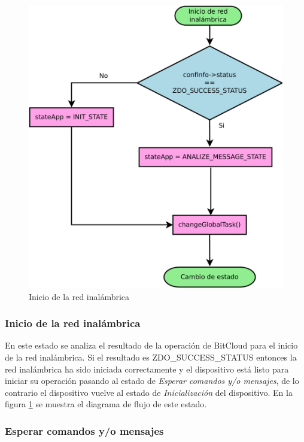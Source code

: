 \begin{figure}
	\centering
	\includegraphics[scale=0.35]{capitulo_3_imgs/inicio_red.pdf}
	\caption{Inicio de la red inalámbrica}
	\label{fig:diagrama_inicio_red}
\end{figure}

\subsubsection{Inicio de la red inalámbrica}

En este estado se analiza el resultado de la operación de BitCloud para el inicio de la red inalámbrica. Si el resultado es ZDO\_SUCCESS\_STATUS entonces la red inalámbrica ha sido iniciada correctamente y el dispositivo está listo para iniciar su operación pasando al estado de \textit{Esperar comandos y/o mensajes}, de lo contrario el dispositivo vuelve al estado de \textit{Inicialización} del dispositivo. En la figura \ref{fig:diagrama_inicio_red} se muestra el diagrama de flujo de este estado.


\subsubsection{Esperar comandos y/o mensajes}

